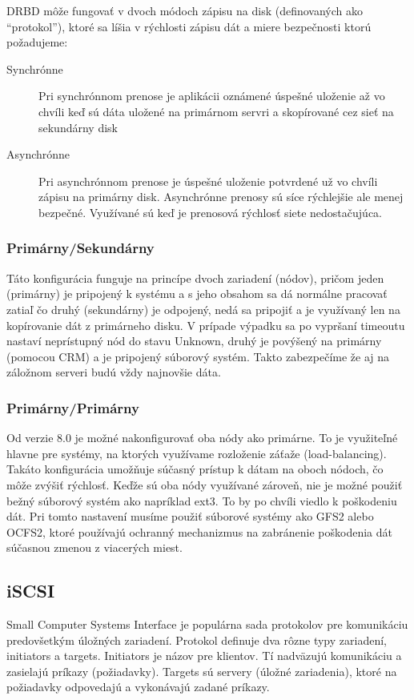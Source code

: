 DRBD môže fungovať v dvoch módoch zápisu na disk (definovaných ako "`protokol"'), ktoré sa líšia v rýchlosti zápisu dát a miere bezpečnosti ktorú požadujeme:

\begin{description}
	\item[Synchrónne] Pri synchrónnom prenose je aplikácii oznámené úspešné uloženie až vo chvíli keď sú dáta uložené na primárnom servri a skopírované cez sieť na sekundárny disk
	\item[Asynchrónne] Pri asynchrónnom prenose je úspešné uloženie potvrdené už vo chvíli zápisu na primárny disk. Asynchrónne prenosy sú síce rýchlejšie ale menej bezpečné. Využívané sú keď je prenosová rýchlosť siete nedostačujúca.
\end{description}

\subsubsection{Primárny/Sekundárny}
Táto konfigurácia funguje na princípe dvoch zariadení (nódov), pričom jeden (primárny) je pripojený k systému a s jeho obsahom sa dá normálne pracovať zatiaľ čo druhý (sekundárny) je odpojený, nedá sa pripojiť a je využívaný len na kopírovanie dát z primárneho disku. V prípade výpadku sa po vypršaní timeoutu nastaví neprístupný nód do stavu Unknown, druhý je povýšený na primárny (pomocou CRM) a je pripojený súborový systém. Takto zabezpečíme že aj na záložnom serveri budú vždy najnovšie dáta.

\subsubsection{Primárny/Primárny}
Od verzie 8.0 je možné nakonfigurovať oba nódy ako primárne. To je využiteľné hlavne pre systémy, na ktorých využívame rozloženie záťaže (load-balancing). Takáto konfigurácia umožňuje súčasný prístup k dátam na oboch nódoch, čo môže zvýšiť rýchlosť. Keďže sú oba nódy využívané zároveň, nie je možné použiť bežný súborový systém ako napríklad ext3. To by po chvíli viedlo k poškodeniu dát. Pri tomto nastavení musíme použiť súborové systémy ako GFS2 alebo OCFS2, ktoré používajú ochranný mechanizmus na zabránenie poškodenia dát súčasnou zmenou z viacerých miest.

\subsection{iSCSI}
Small Computer Systems Interface je populárna sada protokolov pre komunikáciu predovšetkým úložných zariadení. Protokol definuje dva rôzne typy zariadení, initiators a targets. Initiators je názov pre klientov. Tí nadväzujú komunikáciu a zasielajú príkazy (požiadavky). Targets sú servery (úložné zariadenia), ktoré na požiadavky odpovedajú a vykonávajú zadané príkazy.

